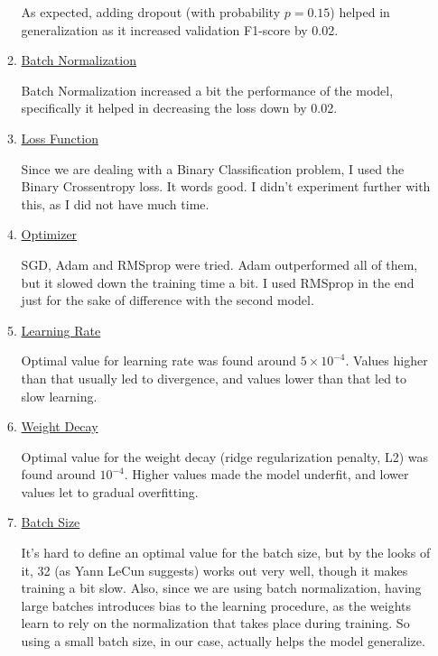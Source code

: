 \documentclass[12pt]{report}
\begin{document}
\begin{itemize}
\begin{enumerate}
        As expected, adding dropout (with probability $p = 0.15$) helped in generalization
        as it increased validation F1-score by 0.02.

    \item \underline{Batch Normalization}
        \smallskip

        Batch Normalization increased a bit the performance of the model, specifically it
        helped in decreasing the loss down by 0.02.

    \item \underline{Loss Function}
        \smallskip

        Since we are dealing with a Binary Classification problem, I used the Binary
        Crossentropy loss. It words good. I didn't experiment further with this, as I
        did not have much time.

    \item \underline{Optimizer}
        \smallskip

        SGD, Adam and RMSprop were tried. Adam outperformed all of them, but it slowed down
        the training time a bit. I used RMSprop in the end just for the sake of difference with
        the second model.

    \item \underline{Learning Rate}
        \smallskip

        Optimal value for learning rate was found around $5\times10^{-4}$. Values higher than that
        usually led to divergence, and values lower than that led to slow learning.

    \item \underline{Weight Decay}
        \smallskip

        Optimal value for the weight decay (ridge regularization penalty, L2) was found around
        $10^{-4}$. Higher values made the model underfit, and lower values let to gradual
        overfitting.
    
    \item \underline{Batch Size}
        \smallskip

        It's hard to define an optimal value for the batch size, but by the looks of it,
        32 (as Yann LeCun suggests) works out very well, though it makes training a bit slow.
        Also, since we are using batch normalization, having large batches introduces bias to
        the learning procedure, as the weights learn to rely on the normalization that
        takes place during training. So using a small batch size, in our case, actually
        helps the model generalize.
\end{enumerate}


\end{itemize}
\end{document}
